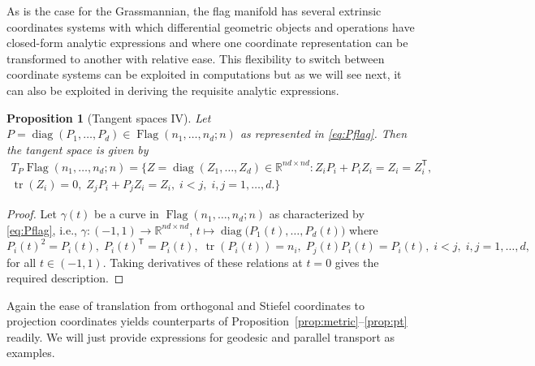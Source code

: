 \documentclass[11pt,reqno]{amsart}%
\newtheorem{proposition}[theorem]{Proposition}
\theoremstyle{definition}
\theoremstyle{remark}
\newcommand{\tp}{{\scriptscriptstyle\mathsf{T}}}
\DeclareMathOperator{\Flag}{Flag}
\DeclareMathOperator{\tr}{tr}
\DeclareMathOperator{\diag}{diag}
\begin{document}
As is the case for the Grassmannian, the flag manifold has several extrinsic coordinates systems with which differential geometric objects and operations have closed-form analytic expressions and  where one coordinate representation can be transformed to another with relative ease. This flexibility to switch between coordinate systems can be exploited in computations but as we will see next, it can also be exploited in deriving the requisite analytic expressions.

\begin{proposition}[Tangent spaces IV]\label{prop:tangent2}
Let $P = \diag(P_1,\dots,P_d) \in \Flag(n_1,\dots, n_d;n)$ as represented in \eqref{eq:Pflag}.
Then the tangent space is given by
\begin{multline}\label{eq:tangent2}
T_P\Flag(n_1,\dots,n_d;n) = \lbrace Z = \diag(Z_1,\dots,Z_d) \in \mathbb{R}^{nd\times nd} :
Z_i P_i + P_i Z_i= Z_i = Z_i^\tp,\\  \tr(Z_i) = 0, \; Z_j P_i + P_j Z_i = Z_i,\; i<j, \; i,j=1,\dots, d. \rbrace
\end{multline}
\end{proposition}
\begin{proof}
Let $\gamma(t)$ be a curve in $\Flag(n_1,\dots,n_d;n)$ as characterized by \eqref{eq:Pflag}, i.e., $\gamma : (-1, 1) \to \mathbb{R}^{nd\times nd}$, $t \mapsto  \diag\bigl(P_1(t),\dots, P_d(t)\bigr)$ where
\begin{equation}\label{eq: curve in flag1}
P_i(t)^2 = P_i(t), \; P_i(t)^\tp  = P_i(t),\; \tr(P_i(t)) = n_i,\; P_j(t)P_i(t) = P_i(t),\; i<j, \; i,j=1,\dots,d,
\end{equation}
for all $t\in (-1,1)$. Taking derivatives of these relations at $t = 0$ gives the required description.
\end{proof}

Again the ease of translation from orthogonal and Stiefel coordinates to projection coordinates yields counterparts of Proposition~\ref{prop:metric}--\ref{prop:pt} readily. We will just provide expressions for geodesic and parallel transport as examples.
\end{document}
